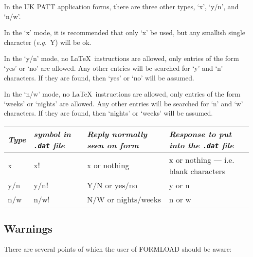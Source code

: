 In the UK PATT application forms, there are three other types, `x', `y/n',
and `n/w'.

In the `x' mode, it is recommended that only `x' be used, but any smallish
single character ({\it e.g.}~{\small Y}) will be ok.

In the `y/n' mode, no \LaTeX\ instructions are allowed, only entries of the
form `yes' or `no' are allowed. Any other entries will be searched for `y'
and `n' characters. If they are found, then `yes' or `no' will be assumed.

In the `n/w' mode, no \LaTeX\ instructions are allowed, only entries of the
form `weeks' or `nights' are allowed. Any other entries will be searched
for `n' and `w' characters. If they are found, then `nights' or `weeks' will
be assumed.


{\small
\begin{tabular}{|l|p{0.6in}|p{1.7in}|p{3.0in}|} \hline
{\it Type} & {\it symbol in {\tt .dat} file}   & {\it Reply normally seen on
form} & {\it Response to put into the {\tt .dat} file} \\ \hline
x     &    x!  &   x or nothing    &  x or nothing --- i.e. blank characters \\ \hline
y/n   &  y/n!  &   Y/N or yes/no   &  y or n \\  \hline
n/w   &  n/w!  &   N/W or nights/weeks &  n  or w \\  \hline
\end{tabular}}


\subsection{Warnings}

There are several points of which the user of FORMLOAD should be aware:

